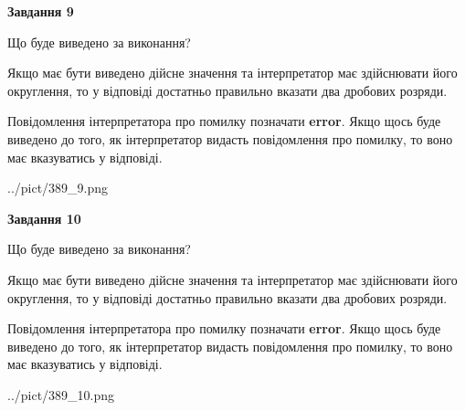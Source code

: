 \documentclass[12pt, ukrainian]{article}
\begin{document}
{\begin {Large}
{\begin {center}\textbf{Завдання 9}\end {center}}\par
Що буде виведено за виконання? \par

Якщо має бути виведено дійсне значення та інтерпретатор має здійснювати його округлення, 
то у відповіді достатньо правильно вказати два дробових розряди.

Повідомлення інтерпретатора про помилку позначати \textbf{error}.
Якщо щось буде виведено до того, як інтерпретатор видасть повідомлення про помилку, 
то воно має вказуватись у відповіді. \par

\begin{center}
	{../pict/389_9.png}
\end{center}
\newpage

{\begin {center}\textbf{Завдання 10}\end {center}}\par
Що буде виведено за виконання? \par

Якщо має бути виведено дійсне значення та інтерпретатор має здійснювати його округлення, 
то у відповіді достатньо правильно вказати два дробових розряди.

Повідомлення інтерпретатора про помилку позначати \textbf{error}.
Якщо щось буде виведено до того, як інтерпретатор видасть повідомлення про помилку, 
то воно має вказуватись у відповіді. \par

\begin{center}
	{../pict/389_10.png}
\end{center}
\newpage

\end {Large}}
\end{document}
